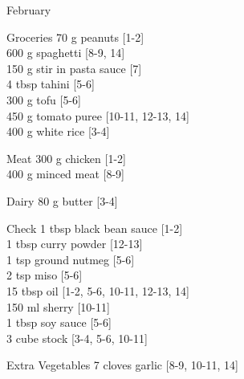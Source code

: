 \begin{menu}{February}
\begin{shoppinglist}{Groceries}
      70 g peanuts 
        {\scriptsize[1-2]}\\
      600 g spaghetti 
        {\scriptsize[8-9, 14]}\\
      150 g stir in pasta sauce 
        {\scriptsize[7]}\\
      4 tbsp tahini 
        {\scriptsize[5-6]}\\
      300 g tofu 
        {\scriptsize[5-6]}\\
      450 g tomato puree 
        {\scriptsize[10-11, 12-13, 14]}\\
      400 g white rice 
        {\scriptsize[3-4]}\\
      \end{shoppinglist}%
      \par\vfil %
      \begin{shoppinglist}{Meat}
      300 g chicken 
        {\scriptsize[1-2]}\\
      400 g minced meat 
        {\scriptsize[8-9]}\\
      \end{shoppinglist}%
      \begin{shoppinglist}{Dairy}
      80 g butter 
        {\scriptsize[3-4]}\\
      \end{shoppinglist}%
      \par\vfil %
      \vfil\clearpage %
      \begin{shoppinglist}{Check}
      1 tbsp black bean sauce 
        {\scriptsize[1-2]}\\
      1 tbsp curry powder 
        {\scriptsize[12-13]}\\
      1 tsp ground nutmeg 
        {\scriptsize[5-6]}\\
      2 tsp miso 
        {\scriptsize[5-6]}\\
      15 tbsp oil 
        {\scriptsize[1-2, 5-6, 10-11, 12-13, 14]}\\
      150 ml sherry 
        {\scriptsize[10-11]}\\
      1 tbsp soy sauce 
        {\scriptsize[5-6]}\\
      3 cube stock 
        {\scriptsize[3-4, 5-6, 10-11]}\\
      \end{shoppinglist}%
      \begin{shoppinglist}{Extra Vegetables}
      7 cloves garlic 
        {\scriptsize[8-9, 10-11, 14]}\\

\end{shoppinglist}
\end{menu}
